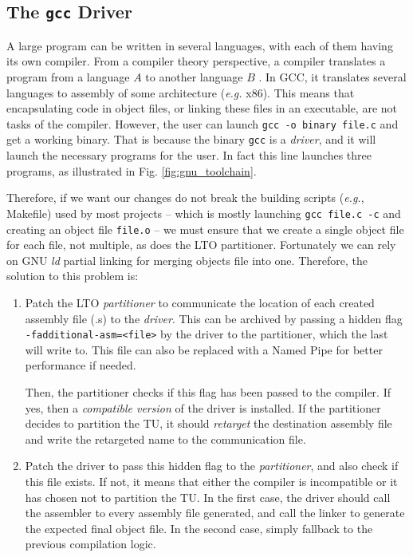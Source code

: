 \documentclass[runningheads]{llncs}
\begin{document}
\subsection{The \texttt{gcc} Driver}\label{sec:gcc_driver}

A large program can be written in several languages, with each of them having
its own compiler. From a compiler theory perspective, a compiler
translates a program from a language $A$ to another language $B$
\cite{dragonbook}. In GCC, it translates several languages to assembly
of some architecture (\textit{e.g.} x86). This means that
encapsulating code in object files, or linking these files in an executable, are
not tasks of the compiler. However, the user can launch \texttt{gcc -o binary
file.c} and get a working binary. That is because the binary \texttt{gcc} is
a \textit{driver}, and it will launch the
necessary programs for the user. In fact this line launches three programs,
as illustrated in Fig. \ref{fig:gnu_toolchain}.

Therefore, if we want our changes do not break the building scripts
(\textit{e.g.}, Makefile) used by most
projects -- which is mostly launching \texttt{gcc file.c -c} and creating an object file \texttt{file.o} -- we must ensure that we create a single object file for each file,
not multiple, as does the LTO partitioner. Fortunately we can rely on GNU \textit{ld}
partial linking for merging objects file into one. Therefore, the solution to this problem
is:
\begin{enumerate}
	\item Patch the LTO \textit{partitioner} to communicate the location of
	each created assembly file (.s) to the \textit{driver}. This can be
	archived by passing a hidden flag \texttt{-fadditional-asm=<file>}
	by the driver to the partitioner, which the last will write to. This file can also
	be replaced with a Named Pipe for better performance if needed.

	Then, the partitioner checks if this flag has been passed to the compiler.
	If yes, then a \textit{compatible version} of the driver is installed. If
	the partitioner decides to partition the TU, it should \textit{retarget}
	the destination assembly file and write the retargeted name to the
	communication file.

	\item Patch the driver to pass this hidden flag to the
	\textit{partitioner}, and also check if this file exists. If not, it means
	that either the compiler is incompatible or it has chosen not to partition
	the TU. In the first case, the driver should call the assembler to every
	assembly file generated, and call the linker to generate the expected
	final object file. In the second case, simply fallback to the previous
	compilation logic.
\end{enumerate}
\end{document}
